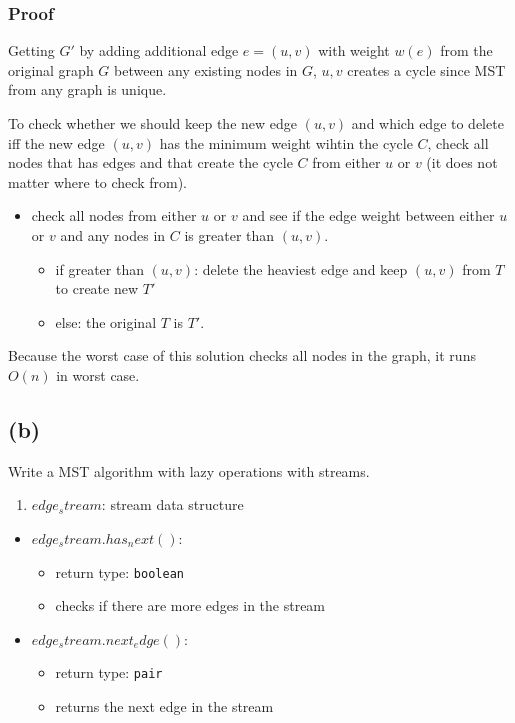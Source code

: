 \documentclass[11pt]{article}
\providecommand{\tightlist}{\setlength{\itemsep}{0pt}\setlength{\parskip}{0pt}}
\begin{document}
\hypertarget{proof}{%
\subsubsection{Proof}\label{proof}}

Getting \(G'\) by adding additional edge \(e=(u,v)\) with weight
\(w(e)\) from the original graph \(G\) between any existing nodes in
\(G\), \(u,v\) creates a cycle since MST from any graph is unique.

To check whether we should keep the new edge \((u,v)\) and which edge to
delete iff the new edge \((u,v)\) has the minimum weight wihtin the
cycle \(C\), check all nodes that has edges and that create the cycle
\(C\) from either \(u\) or \(v\) (it does not matter where to check
from).

\begin{itemize}
\item
  check all nodes from either \(u\) or \(v\) and see if the edge weight
  between either \(u\) or \(v\) and any nodes in \(C\) is greater than
  \((u,v)\).

  \begin{itemize}
  \item
    if greater than \((u,v)\): delete the heaviest edge and keep
    \((u,v)\) from \(T\) to create new \(T'\)
  \item
    else: the original \(T\) is \(T'\).
  \end{itemize}
\end{itemize}

Because the worst case of this solution checks all nodes in the graph,
it runs \(O(n)\) in worst case.

\hypertarget{b}{%
\subsection{(b)}\label{b}}

Write a MST algorithm with lazy operations with streams.

\begin{enumerate}
\def\labelenumi{\arabic{enumi}.}
\tightlist
\item
  \(edge_stream\): stream data structure
\end{enumerate}

\begin{itemize}
\item
  \(edge_stream.has_next()\):

  \begin{itemize}
  \item
    return type: \texttt{boolean}
  \item
    checks if there are more edges in the stream
  \end{itemize}
\item
  \(edge_stream.next_edge()\):

  \begin{itemize}
  \item
    return type: \texttt{pair}
  \item
    returns the next edge in the stream
  \end{itemize}
\end{itemize}
\end{document}
